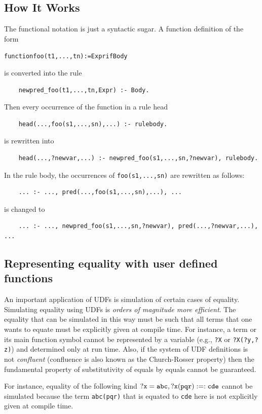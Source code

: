 \documentclass[11pt]{article}
\begin{document}
\subsection{How It Works}

The functional notation is just a syntactic sugar. A function definition
of the form
\begin{alltt}
    function foo(t1,...,tn) := Expr if Body
\end{alltt}
is converted into the rule
\begin{verbatim}
    newpred_foo(t1,...,tn,Expr) :- Body.
\end{verbatim}
Then every occurrence of the function in a rule head
\begin{verbatim}
    head(...,foo(s1,...,sn),...) :- rulebody.
\end{verbatim}
is rewritten into
\begin{verbatim}
    head(...,?newvar,...) :- newpred_foo(s1,...,sn,?newvar), rulebody.
\end{verbatim}
In the rule body, the occurrences of \texttt{foo(s1,...,sn)}  are rewritten as
follows:
\begin{verbatim}
    ... :- ..., pred(...,foo(s1,...,sn),...), ...
\end{verbatim}
is changed to
\begin{verbatim}
    ... :- ..., newpred_foo(s1,...,sn,?newvar), pred(...,?newvar,...), ...
\end{verbatim}


\subsection{Representing equality with user defined functions}

An important application of UDFs is simulation of certain cases of
equality.
Simulating equality using UDFs is \emph{orders of magnitude more
  efficient}.  
The equality that can be simulated in this way must be such
that all terms that one wants to equate must be explicitly given at
compile time. For instance, a term or its main function symbol cannot be
represented by a variable (e.g., \texttt{?X} or \texttt{?X(?y,?z)})  and
determined only at run time.
Also, if the system of UDF definitions is not \emph{confluent} 
(confluence is also known as the Church-Rosser property) then
the fundamental property of
substitutivity of equals by equals cannot be guaranteed.


For instance, equality of the following kind $\tt ?x=abc, ?x(pqr) :=: cde$
cannot be simulated because the term \texttt{abc(pqr)} that is equated to
\texttt{cde} here is not explicitly given at compile time.  
\end{document}
